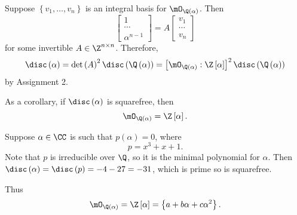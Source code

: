 \documentclass[pmath441]{subfiles}
\begin{document}
    \np Suppose $\left\lbrace v_1,\ldots,v_n \right\rbrace$ is an integral basis for $\mO_{\Q\left( \alpha \right)}$. Then
    \begin{equation*}
        \begin{bmatrix} 1\\\cdots\\\alpha^{n-1} \end{bmatrix} = A \begin{bmatrix} v_1\\\cdots\\v_n \end{bmatrix}
    \end{equation*}
    for some invertible $A\in\Z^{n\times n}$. Therefore,
    \begin{equation*}
        \disc\left( \alpha \right) = \det\left( A \right)^{2}\disc\left( \Q\left( \alpha \right) \right) = \left[ \mO_{\Q\left( \alpha \right)}:\Z\left[ \alpha \right] \right]^{2}\disc\left( \Q\left( \alpha \right) \right)
    \end{equation*}
    by Assignment 2.

    \np As a corollary, if $\disc\left( \alpha \right)$ is squarefree, then
    \begin{equation*}
        \mO_{\Q\left( \alpha \right)} = \Z\left[ \alpha \right].
    \end{equation*}

    \begin{example}{}
        Suppose $\alpha\in\CC$ is such that $p\left( \alpha \right) = 0$, where
        \begin{equation*}
            p = x^{3}+x+1.
        \end{equation*}
        Note that $p$ is irreducible over $\Q$, so it is the minimal polynomial for $\alpha$. Then $\disc\left( \alpha \right) = \disc\left( p \right) = -4-27 = -31$, which is prime so is squarefree.

        Thus
        \begin{equation*}
            \mO_{\Q\left( \alpha \right)} = \Z\left[ \alpha \right] = \left\lbrace a+b\alpha+c\alpha^{2} \right\rbrace.
        \end{equation*}
    \end{example}

    \rruleline
    
\end{document}

